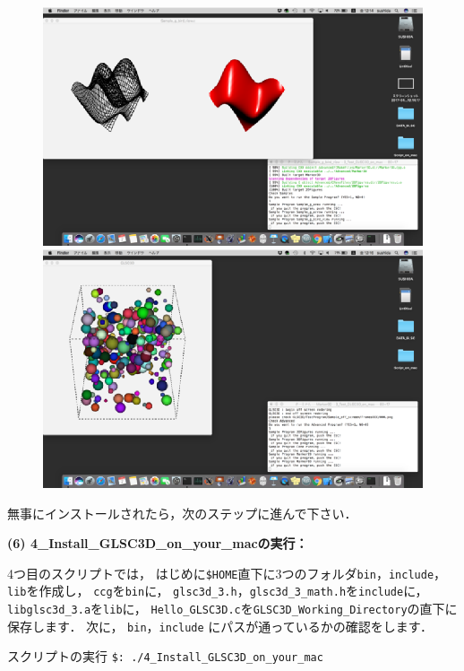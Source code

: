\documentclass[platex,a4paper,12pt]{jsarticle}%
\begin{document}
\begin{figure}[htb]
\centering
\includegraphics[scale=.6]{Canvas_Samples.eps}
\hspace{2zw}
\includegraphics[scale=.6]{Canvas_Advanced.eps}
\end{figure}

無事にインストールされたら，次のステップに進んで下さい．

\noindent 
{\bf (6) 4\_Install\_GLSC3D\_on\_your\_macの実行：} 

4つ目のスクリプトでは，
はじめに\verb|$HOME|直下に3つのフォルダ\verb|bin|，\verb|include|，\verb|lib|を作成し，
\verb|ccg|を\verb|bin|に，
\verb|glsc3d_3.h|，\verb|glsc3d_3_math.h|を\verb|include|に，
\verb|libglsc3d_3.a|を\verb|lib|に，
\verb|Hello_GLSC3D.c|を\verb|GLSC3D_Working_Directory|の直下に保存します．
次に，
\verb|bin|，\verb|include|
にパスが通っているかの確認をします．

\begin{itembox}[l]{スクリプトの実行}
\verb|$: ./4_Install_GLSC3D_on_your_mac|
\end{itembox}
\end{document}
